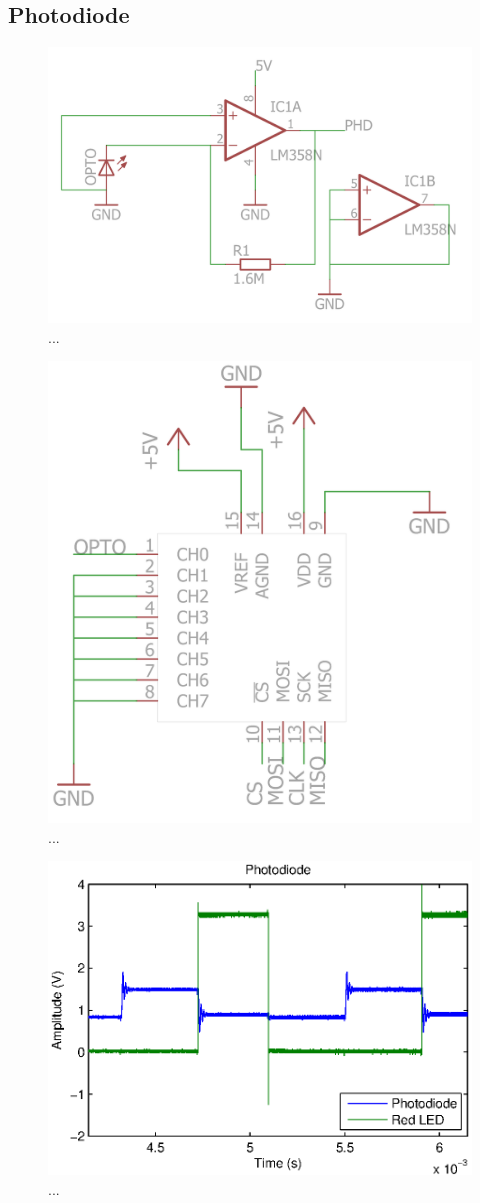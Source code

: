 

\subsection{Photodiode}


\begin{figure}[H]
\centering 
\includegraphics[width = 0.4 \textwidth]{images/optoamplifier_schematics}
\caption{...}
\label{fig:...}
\end{figure}


\begin{figure}[H]
\centering 
\includegraphics[width = 0.4 \textwidth]{images/ADC_schematics}
\caption{...}
\label{fig:...}
\end{figure}


\begin{figure}[H]
\centering 
\includegraphics[width = 0.9 \textwidth]{images/photodiode}
\caption{...}
\label{fig:...}
\end{figure}